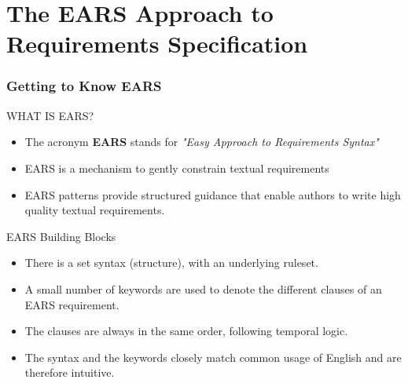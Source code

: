 \documentclass[aspectratio=169]{beamer}
\begin{document}
\frame[plain]{\titlepage}

\section*{The EARS Approach to Requirements Specification}

\begin{frame}
  \small
  \frametitle{Getting to Know EARS}
  \begin{block}{WHAT IS EARS?}
  \begin{itemize}
    \item The acronym {\bf EARS} stands for {\it "Easy Approach to Requirements Syntax"} 
    \item EARS is a mechanism to gently constrain textual requirements
    \item EARS patterns provide structured guidance that enable authors to write high quality textual requirements.
  \end{itemize}
\end{block}

\begin{block}{EARS Building Blocks}
  \begin{itemize}
    \item There is a set syntax (structure), with an underlying ruleset. 
    \item A small number of keywords are used to denote the different clauses of an EARS requirement. 
    \item The clauses are always in the same order, following temporal logic. 
    \item The syntax and the keywords closely match common usage of English and are therefore intuitive.
  \end{itemize}  
\end{block}

\end{frame}
\end{document}
